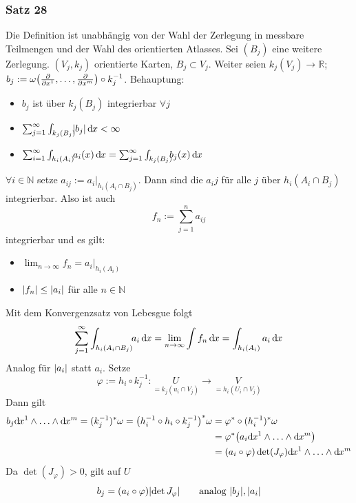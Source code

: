 \subsubsection{Satz 28} %
\label{ssub:554}
Die Definition ist unabhängig von der Wahl der Zerlegung in messbare Teilmengen und der Wahl des orientierten Atlasses. 
Sei $(B_j)$ eine weitere Zerlegung. $(V_j, k_j)$ orientierte Karten, $B_j \subset V_j$. Weiter seien $k_j(V_j) \to \mathds{R}$; 
$b_j := \omega \enbrace*{\diff{}{x^1}, \ldots , \diff{}{x^m}}\circ k_j ^{-1}$. Behauptung:
\begin{itemize}
	\item $b_j$ ist über $k_j(B_j)$ integrierbar $\forall j$
	\item $\sum_{j=1}^{\infty}  \int_{k_j(B_j)} \! \!  \abs*{b_j}  \, \mathd x < \infty $ 
	\item $\sum_{i=1}^{\infty} \int_{h_i(A_i)}\! \!  a_i(x)  \, \mathd x  = \sum_{j=1}^{\infty} \int_{k_j(B_j)}\! \! \! b_j(x)  \, \mathd x  $
\end{itemize}
$\forall i \in \mathds{N}$ setze $a_{ij} := a_i \big|_{h_i(A_i \cap B_j)}$. Dann sind die $a_ij$ für alle $j$ über $h_i(A_i \cap B_j)$ integrierbar. Also ist auch
\[
	f_n := \sum_{j=1}^{n} a_{ij}
\]
integrierbar und es gilt:
\begin{itemize}
	\item $\lim_{ n \to \infty} f_n = a_i \big|_{h_i(A_i)}$
	\item $\abs*{f_n} \le \abs*{a_i}  $ für alle $n \in \mathds{N}$
\end{itemize}
Mit dem Konvergenzsatz von Lebesgue folgt
\[
	\sum_{j=1}^{\infty} \int_{h_i(A_i \cap B_j)} \! \! a_i  \, \mathd x = \lim_{ n \to \infty} \int f_n  \, \mathd x = \int_{h_i(A_i)} a_i  \, \mathd x 
\]
Analog für $\abs*{a_i}$ statt $a_i$. Setze
\[
	\varphi := h_i \circ k_j ^{-1} : \underset{=k_j(u_i \cap V_j)}{U} \to \underset{=h_i(U_i \cap V_j)}{V}
\]
Dann gilt 
\begin{align*}
	b_j \mathd x^1 \wedge \ldots \wedge \mathd x^m = (k_j ^{-1})^* \omega = \enbrace*{h_i ^{-1} \circ h_i \circ k_j ^{-1}}^* \omega &= \varphi^* \circ (h_i ^{-1})^* \omega\\
	&= \varphi^* \enbrace*{a_i \mathd x^1 \wedge \ldots \wedge \mathd x^m} \\
	&= (a_i \circ \varphi) \det (J_\varphi) \mathd x^1 \wedge \ldots \wedge \mathd x^m
\end{align*}
Da $\det(J_\varphi)>0$, gilt auf $U$
\[
	b_j = (a_i \circ \varphi) \abs*{\det J_\varphi} \tag*{analog $\abs*{b_j}, \abs*{a_i}$} 
\]
